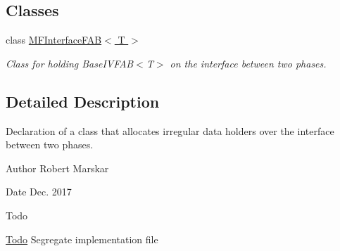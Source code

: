 \subsection*{Classes}
\begin{DoxyCompactItemize}
\item 
class \hyperlink{classMFInterfaceFAB}{M\+F\+Interface\+F\+A\+B$<$ T $>$}
\begin{DoxyCompactList}\small\item\em Class for holding Base\+I\+V\+F\+A\+B$<$\+T$>$ on the interface between two phases. \end{DoxyCompactList}\end{DoxyCompactItemize}


\subsection{Detailed Description}
Declaration of a class that allocates irregular data holders over the interface between two phases. 

\begin{DoxyAuthor}{Author}
Robert Marskar 
\end{DoxyAuthor}
\begin{DoxyDate}{Date}
Dec. 2017 
\end{DoxyDate}
\begin{DoxyRefDesc}{Todo}
\item[\hyperlink{todo__todo000004}{Todo}]Segregate implementation file \end{DoxyRefDesc}
